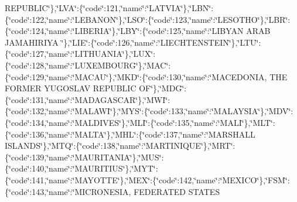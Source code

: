 \begin{DoxyCompactItemize}
R\-E\-P\-U\-B\-L\-I\-C\char`\"{}\},\char`\"{}L\-V\-A\char`\"{}\-:\{\char`\"{}code\char`\"{}\-:121,\char`\"{}name\char`\"{}\-:\char`\"{}L\-A\-T\-V\-I\-A\char`\"{}\},\char`\"{}L\-B\-N\char`\"{}\-:\{\char`\"{}code\char`\"{}\-:122,\char`\"{}name\char`\"{}\-:\char`\"{}L\-E\-B\-A\-N\-O\-N\char`\"{}\},\char`\"{}L\-S\-O\char`\"{}\-:\{\char`\"{}code\char`\"{}\-:123,\char`\"{}name\char`\"{}\-:\char`\"{}L\-E\-S\-O\-T\-H\-O\char`\"{}\},\char`\"{}L\-B\-R\char`\"{}\-:\{\char`\"{}code\char`\"{}\-:124,\char`\"{}name\char`\"{}\-:\char`\"{}L\-I\-B\-E\-R\-I\-A\char`\"{}\},\char`\"{}L\-B\-Y\char`\"{}\-:\{\char`\"{}code\char`\"{}\-:125,\char`\"{}name\char`\"{}\-:\char`\"{}L\-I\-B\-Y\-A\-N A\-R\-A\-B J\-A\-M\-A\-H\-I\-R\-I\-Y\-A \char`\"{}\},\char`\"{}L\-I\-E\char`\"{}\-:\{\char`\"{}code\char`\"{}\-:126,\char`\"{}name\char`\"{}\-:\char`\"{}L\-I\-E\-C\-H\-T\-E\-N\-S\-T\-E\-I\-N\char`\"{}\},\char`\"{}L\-T\-U\char`\"{}\-:\{\char`\"{}code\char`\"{}\-:127,\char`\"{}name\char`\"{}\-:\char`\"{}L\-I\-T\-H\-U\-A\-N\-I\-A\char`\"{}\},\char`\"{}L\-U\-X\char`\"{}\-:\{\char`\"{}code\char`\"{}\-:128,\char`\"{}name\char`\"{}\-:\char`\"{}L\-U\-X\-E\-M\-B\-O\-U\-R\-G\char`\"{}\},\char`\"{}M\-A\-C\char`\"{}\-:\{\char`\"{}code\char`\"{}\-:129,\char`\"{}name\char`\"{}\-:\char`\"{}M\-A\-C\-A\-U\char`\"{}\},\char`\"{}M\-K\-D\char`\"{}\-:\{\char`\"{}code\char`\"{}\-:130,\char`\"{}name\char`\"{}\-:\char`\"{}M\-A\-C\-E\-D\-O\-N\-I\-A, T\-H\-E F\-O\-R\-M\-E\-R Y\-U\-G\-O\-S\-L\-A\-V R\-E\-P\-U\-B\-L\-I\-C O\-F\char`\"{}\},\char`\"{}M\-D\-G\char`\"{}\-:\{\char`\"{}code\char`\"{}\-:131,\char`\"{}name\char`\"{}\-:\char`\"{}M\-A\-D\-A\-G\-A\-S\-C\-A\-R\char`\"{}\},\char`\"{}M\-W\-I\char`\"{}\-:\{\char`\"{}code\char`\"{}\-:132,\char`\"{}name\char`\"{}\-:\char`\"{}M\-A\-L\-A\-W\-I\char`\"{}\},\char`\"{}M\-Y\-S\char`\"{}\-:\{\char`\"{}code\char`\"{}\-:133,\char`\"{}name\char`\"{}\-:\char`\"{}M\-A\-L\-A\-Y\-S\-I\-A\char`\"{}\},\char`\"{}M\-D\-V\char`\"{}\-:\{\char`\"{}code\char`\"{}\-:134,\char`\"{}name\char`\"{}\-:\char`\"{}M\-A\-L\-D\-I\-V\-E\-S\char`\"{}\},\char`\"{}M\-L\-I\char`\"{}\-:\{\char`\"{}code\char`\"{}\-:135,\char`\"{}name\char`\"{}\-:\char`\"{}M\-A\-L\-I\char`\"{}\},\char`\"{}M\-L\-T\char`\"{}\-:\{\char`\"{}code\char`\"{}\-:136,\char`\"{}name\char`\"{}\-:\char`\"{}M\-A\-L\-T\-A\char`\"{}\},\char`\"{}M\-H\-L\char`\"{}\-:\{\char`\"{}code\char`\"{}\-:137,\char`\"{}name\char`\"{}\-:\char`\"{}M\-A\-R\-S\-H\-A\-L\-L I\-S\-L\-A\-N\-D\-S\char`\"{}\},\char`\"{}M\-T\-Q\char`\"{}\-:\{\char`\"{}code\char`\"{}\-:138,\char`\"{}name\char`\"{}\-:\char`\"{}M\-A\-R\-T\-I\-N\-I\-Q\-U\-E\char`\"{}\},\char`\"{}M\-R\-T\char`\"{}\-:\{\char`\"{}code\char`\"{}\-:139,\char`\"{}name\char`\"{}\-:\char`\"{}M\-A\-U\-R\-I\-T\-A\-N\-I\-A\char`\"{}\},\char`\"{}M\-U\-S\char`\"{}\-:\{\char`\"{}code\char`\"{}\-:140,\char`\"{}name\char`\"{}\-:\char`\"{}M\-A\-U\-R\-I\-T\-I\-U\-S\char`\"{}\},\char`\"{}M\-Y\-T\char`\"{}\-:\{\char`\"{}code\char`\"{}\-:141,\char`\"{}name\char`\"{}\-:\char`\"{}M\-A\-Y\-O\-T\-T\-E\char`\"{}\},\char`\"{}M\-E\-X\char`\"{}\-:\{\char`\"{}code\char`\"{}\-:142,\char`\"{}name\char`\"{}\-:\char`\"{}M\-E\-X\-I\-C\-O\char`\"{}\},\char`\"{}F\-S\-M\char`\"{}\-:\{\char`\"{}code\char`\"{}\-:143,\char`\"{}name\char`\"{}\-:\char`\"{}M\-I\-C\-R\-O\-N\-E\-S\-I\-A, F\-E\-D\-E\-R\-A\-T\-E\-D S\-T\-A\-T\-E\-S 
\end{DoxyCompactItemize}
